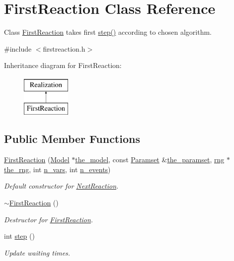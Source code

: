 \hypertarget{class_first_reaction}{}\section{First\+Reaction Class Reference}
\label{class_first_reaction}


Class \hyperlink{class_first_reaction}{First\+Reaction} takes first \hyperlink{class_first_reaction_aed63c3c95d20b2ad557dabb6c5376a73}{step()} according to chosen algorithm.  




{\ttfamily \#include $<$firstreaction.\+h$>$}

Inheritance diagram for First\+Reaction\+:\begin{figure}[H]
\begin{center}
\leavevmode
\includegraphics[height=2.000000cm]{class_first_reaction}
\end{center}
\end{figure}
\subsection*{Public Member Functions}
\begin{DoxyCompactItemize}
\item 
\hyperlink{class_first_reaction_a5122d48f6ecbe17a75cecd41b06ac4a2}{First\+Reaction} (\hyperlink{class_model}{Model} $\ast$\hyperlink{class_realization_a47ec1d062b8caee874b08c1a17d6aeeb}{the\+\_\+model}, const \hyperlink{class_paramset}{Paramset} \&\hyperlink{class_realization_a119bb29de88929bc51bc1b329473a94b}{the\+\_\+paramset}, \hyperlink{classrng}{rng} $\ast$\hyperlink{class_realization_ac8d358d929afae90cf5790675b6744f9}{the\+\_\+rng}, int \hyperlink{class_realization_ad9951a0829e68e12fcb3817735bb5097}{n\+\_\+vars}, int \hyperlink{class_realization_afb711282bef806fc0020f91252d1df2c}{n\+\_\+events})
\begin{DoxyCompactList}\small\item\em Default constructor for \hyperlink{class_next_reaction}{Next\+Reaction}. \end{DoxyCompactList}\item 
\hyperlink{class_first_reaction_ae2d082e400c86abd63ae8a30683c0469}{$\sim$\+First\+Reaction} ()
\begin{DoxyCompactList}\small\item\em Destructor for \hyperlink{class_first_reaction}{First\+Reaction}. \end{DoxyCompactList}\item 
int \hyperlink{class_first_reaction_aed63c3c95d20b2ad557dabb6c5376a73}{step} ()
\begin{DoxyCompactList}\small\item\em Update waiting times. \end{DoxyCompactList}\end{DoxyCompactItemize}
